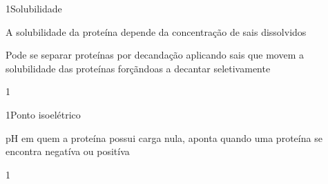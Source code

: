 \documentclass[\mainfilename]{subfiles}
\begin{document}
\begin{questionBox}
            
            
            
    
\end{questionBox}

\begin{sectionBox}1{Solubilidade}
    
    A solubilidade da proteína depende da concentração de sais dissolvidos

    Pode se separar proteínas por decandação aplicando sais que movem a solubilidade das proteínas forçãndoas a decantar seletivamente
    
\end{sectionBox}

\begin{questionBox}1{}
    
    
\end{questionBox}

\begin{sectionBox}1{Ponto isoelétrico}
    
    pH em quem a proteína possui carga nula, aponta quando uma proteína se encontra negatíva ou positíva
    
\end{sectionBox}

\begin{questionBox}1{}
    
    
    
\end{questionBox}
\end{document}
